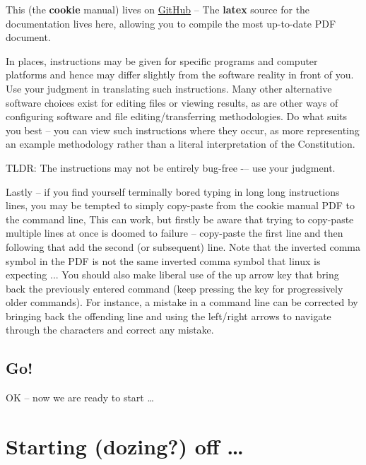 This (the \textbf{cookie} manual) lives on \href{https://github.com/genie-model/cookiedoc}{GitHub} -- The \textbf{latex} source for the documentation lives here, allowing you to compile the most up-to-date PDF document. 

In places, instructions may be given for specific programs and computer platforms and hence may differ slightly from the software reality in front of you. Use your judgment in translating such instructions. Many other alternative software choices exist for editing files or viewing results, as are other ways of configuring software and file editing/transferring methodologies. Do what suits you best – you can view such instructions where they occur, as  more representing an example methodology rather than a literal interpretation of the Constitution.

TLDR: The instructions may not be entirely bug-free -– use your judgment.

Lastly -- if you find yourself terminally bored typing in long long instructions lines, you may be tempted to simply copy-paste from the cookie manual PDF to the command line, This can work, but firstly be aware that trying to copy-paste multiple lines at once is doomed to failure -- copy-paste the first line and then following that add the second (or subsequent) line. Note that the inverted comma symbol in the PDF is not the same inverted comma symbol that linux is expecting ... You should also make liberal use of the up arrow key that bring back the previously entered command (keep pressing the key for progressively older commands). For instance, a mistake in a command line can be corrected by bringing back the offending line and using the left/right arrows to navigate through the characters and correct any mistake.


\subsection*{Go!}

OK – now we are ready to start …

\newpage

\section{Starting (dozing?) off …}

